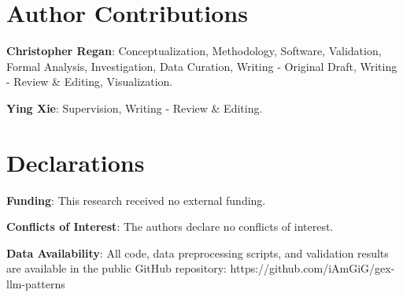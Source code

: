 \documentclass[12pt]{article}
\begin{document}
\section*{Author Contributions}

\textbf{Christopher Regan}: Conceptualization, Methodology, Software, Validation, Formal Analysis, Investigation, Data Curation, Writing - Original Draft, Writing - Review \& Editing, Visualization.

\textbf{Ying Xie}: Supervision, Writing - Review \& Editing.

\vspace{1cm}

\section*{Declarations}

\textbf{Funding}: This research received no external funding.

\textbf{Conflicts of Interest}: The authors declare no conflicts of interest.

\textbf{Data Availability}: All code, data preprocessing scripts, and validation results are available in the public GitHub repository: https://github.com/iAmGiG/gex-llm-patterns
\end{document}
